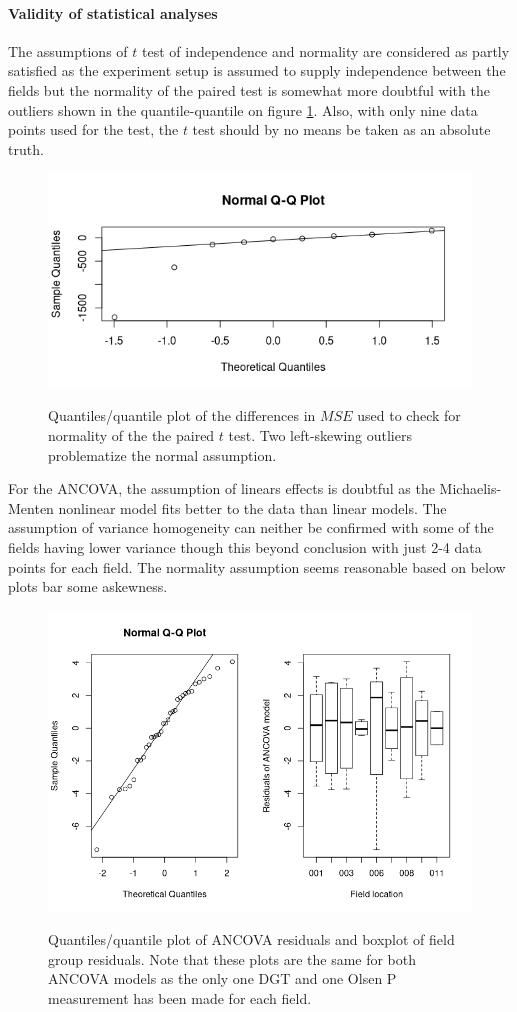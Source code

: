 \documentclass[11pt,fleqn]{article}
\begin{document}
\paragraph{Validity of statistical analyses} The assumptions of \(t\) test of independence and normality are considered as partly satisfied as the experiment setup is assumed to supply independence between the fields but the normality of the paired test is somewhat more doubtful with the outliers shown in the quantile-quantile on figure \ref{fig:qq}. Also, with only nine data points used for the test, the $ t $ test should by no means be taken as an absolute truth.
\begin{figure}[H]
	\centering
	\includegraphics[width=.5\linewidth]{p2_t_qq}
	\label{fig:tqq}
	\caption{Quantiles/quantile plot of the differences in \(MSE\) used to check for normality of the the paired $t$ test. Two left-skewing outliers problematize the normal assumption.}\label{fig:qq}
\end{figure} \noindent 
For the ANCOVA, the assumption of linears effects is doubtful as the Michaelis-Menten nonlinear model fits better to the data than linear models. The assumption of variance homogeneity can neither be confirmed with some of the fields having lower variance though this beyond conclusion with just 2-4 data points for each field. The normality assumption seems reasonable based on below plots bar some askewness.
\begin{figure}[H]
	\centering
	\includegraphics[width=.75\linewidth]{p2_ancova_qq}
	\label{fig:tqq}
	\caption{Quantiles/quantile plot of ANCOVA residuals and boxplot of field group residuals. Note that these plots are the same for both ANCOVA models as the only one DGT and one Olsen P measurement has been made for each field.}
\end{figure} \noindent 
\end{document}
